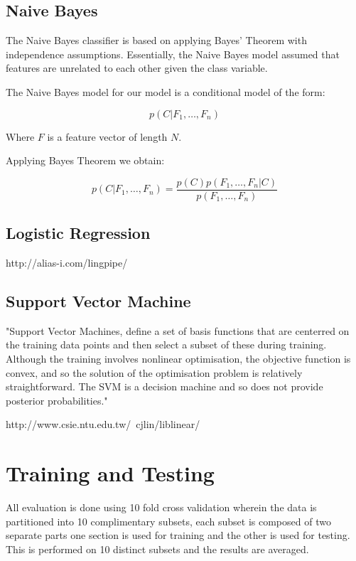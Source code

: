 \subsection{Naive Bayes}
\label{sec:nb}

The Naive Bayes classifier is based on applying Bayes' Theorem with independence assumptions. Essentially, the Naive Bayes model assumed that features 
are unrelated to each other given the class variable.

The Naive Bayes model for our model is a conditional model of the form:

\[
 p(C | F_1,\dots,F_n)
\]

Where \( F \) is a feature vector of length \( N \).

Applying Bayes Theorem we obtain:

\[
 p(C|F_1,\dots,F_n) = \frac{p(C)p(F_1,\dots,F_n|C)}{p(F_1,\dots,F_n)}
\]

\subsection{Logistic Regression}
\label{sec:lr}

http://alias-i.com/lingpipe/

\subsection{Support Vector Machine}
\label{sec:svm}

"Support Vector Machines, define a set of basis functions that are centerred on the training data points and then select a subset of these 
during training. Although the training involves nonlinear optimisation, the objective function is convex, and so the solution of the optimisation 
problem is relatively straightforward. The SVM is a decision machine and so does not provide posterior probabilities."

http://www.csie.ntu.edu.tw/~cjlin/liblinear/

\section{Training and Testing}
\label{sec:tt}

All evaluation is done using 10 fold cross validation wherein the data is partitioned into 10 complimentary subsets, each subset is composed of 
two separate parts one section is used for training and the other is used for testing. 
This is performed on 10 distinct subsets and the results are averaged.

